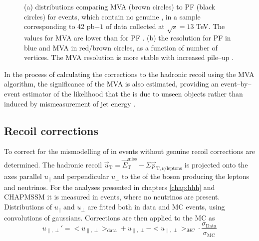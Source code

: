 \begin{figure}
\begin{center}
\end{center}
\caption{(a) \MET distributions comparing MVA \MET (brown circles) to \ac{PF} \MET (black circles) for
\Zmm events, which contain no genuine \MET, in a sample corresponding to 42 pb${-1}$ of data collected at $\sqrt{s}=13$ TeV. The \MET
values for MVA \MET are lower than for \ac{PF} \MET. (b) the \MET resolution for \ac{PF} \MET in blue and MVA \MET in red/brown
circles, as a function of number of vertices. The MVA \MET resolution is more stable with increased pile--up \cite{cms-dp-mvamet}.}
\label{fig:objects_mvamet}
\end{figure}


In the process of calculating the corrections to the hadronic recoil using the MVA \MET
algorithm, the significance of the MVA \MET is also estimated, providing an event--by--event
estimator of the likelihood that the \MET is due to unseen objects rather than induced
by mismeasurement of jet energy \cite{cms-met-run1}.



\subsection{Recoil corrections}
\label{sec:objects_met_recoilcorr}
To correct for the mismodelling of \MET in events without genuine \MET recoil corrections are determined. 
The hadronic recoil $\vec{u}_{\text{T}} = \vec{E}_{\text{T}}^{\text{miss}} - \Sigma \vec{p}_{\text{T},\nu/\text{leptons}}$ 
is projected onto the axes parallel $u_{\parallel}$ and perpendicular $u_{\perp}$ to the \pT of the boson producing the leptons
and neutrinos. For the analyses
presented in chapters \ref{chap:hhh} and CHAPMSSM it is measured in \Zmm events, where no neutrinos
are present. Distributions of $u_{\parallel}$ and $u_{\perp}$ are fitted both in data
and \ac{MC} events, using convolutions of gaussians. Corrections are then applied to the \ac{MC}
as
\begin{equation}\label{eqn:met_recoilcorr}
u_{\parallel,\perp}' = <u_{\parallel,\perp}>_{\text{data}} + u_{\parallel,\perp} - <u_{\parallel,\perp}>_{MC} \cdot \frac{\sigma_{\text{Data}}}{\sigma_{\text{MC}}}
\end{equation}

